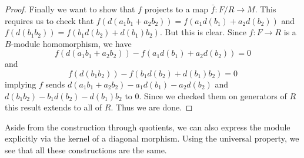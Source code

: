 \documentclass[a4paper]{article}
\begin{document}
\begin{prp}{}{}
\begin{proof}
Finally we want to show that $f$ projects to a map $\bar{f}:F/R\to M$. This requires us to check that $f(d(a_1b_1+a_2b_2))=f(a_1d(b_1)+a_2d(b_2))$ and $f(d(b_1b_2))=f(b_1d(b_2)+d(b_1)b_2)$. But this is clear. Since $f:F\to R$ is a $B$-module homomorphism, we have $$f(d(a_1b_1+a_2b_2))-f(a_1d(b_1)+a_2d(b_2))=0$$ and $$f(d(b_1b_2))-f(b_1d(b_2)+d(b_1)b_2)=0$$ implying $f$ sends $d(a_1b_1+a_2b_2)-a_1d(b_1)-a_2d(b_2)$ and $d(b_1b_2)-b_1d(b_2)-d(b_1)b_2$ to $0$. Since we checked them on generators of $R$ this result extends to all of $R$. Thus we are done. 
\end{proof}
\end{prp}

Aside from the construction through quotients, we can also express the module explicitly via the kernel of a diagonal morphism. Using the universal property, we see that all these constructions are the same. 
\end{document}
